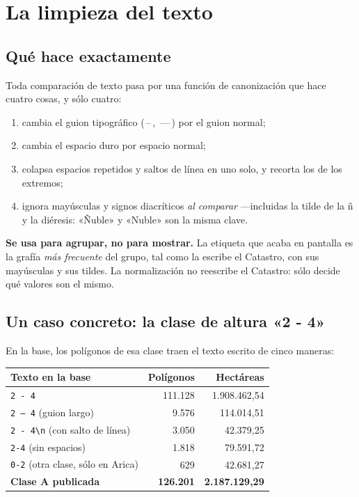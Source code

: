 \documentclass[11pt,a4paper]{report}
\newcommand{\campo}[1]{\textcolor{conaf}{\textbf{#1}}}
\newcommand{\orig}[1]{\texttt{\small #1}}
\begin{document}
\chapter{La limpieza del texto}

\section{Qué hace exactamente}

Toda comparación de texto pasa por una función de canonización que hace cuatro
cosas, y sólo cuatro:

\begin{enumerate}[itemsep=1pt]
  \item cambia el guion tipográfico (\,–\,, \,—\,) por el guion normal;
  \item cambia el espacio duro por espacio normal;
  \item colapsa espacios repetidos y saltos de línea en uno solo, y recorta los
        de los extremos;
  \item ignora mayúsculas y signos diacríticos \emph{al comparar} —incluidas la
        tilde de la ñ y la diéresis: «Ñuble» y «Nuble» son la misma clave.
\end{enumerate}

\begin{nota}
\campo{Se usa para agrupar, no para mostrar.} La etiqueta que acaba en pantalla
es la grafía \emph{más frecuente} del grupo, tal como la escribe el Catastro,
con sus mayúsculas y sus tildes. La normalización no reescribe el Catastro: sólo
decide qué valores son el mismo.
\end{nota}

\section{Un caso concreto: la clase de altura «2 - 4»}

En la base, los polígonos de esa clase traen el texto escrito de cinco maneras:

\begin{center}
\begin{tabular}{@{}lrr@{}}
\toprule
\textbf{Texto en la base} & \textbf{Polígonos} & \textbf{Hectáreas}\\
\midrule
\orig{2 - 4} & 111.128 & 1.908.462,54\\
\orig{2 – 4} \small(guion largo) & 9.576 & 114.014,51\\
\orig{2 - 4\textbackslash n} \small(con salto de línea) & 3.050 & 42.379,25\\
\orig{2-4} \small(sin espacios) & 1.818 & 79.591,72\\
\orig{0-2} \small(otra clase, sólo en Arica) & 629 & 42.681,27\\
\midrule
\textbf{Clase A publicada} & \textbf{126.201} & \textbf{2.187.129,29}\\
\bottomrule
\end{tabular}
\end{center}
\end{document}
